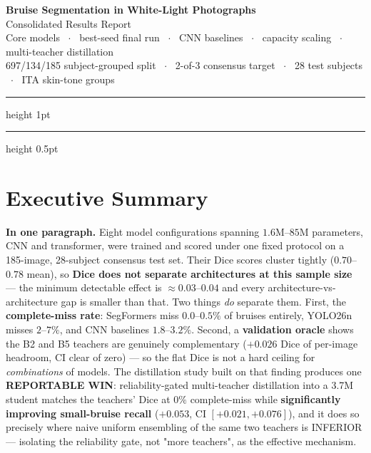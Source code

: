 \documentclass[11pt]{article}
\newcommand{\win}[1]{\textcolor{wingreen}{\textbf{#1}}}
\newcommand{\lose}[1]{\textcolor{losered}{#1}}
\begin{document}
\begin{center}
  {\LARGE\bfseries Bruise Segmentation in White-Light Photographs}\\[5pt]
  {\large Consolidated Results Report}\\[6pt]
  {\small Core models \, $\cdot$ \, best-seed final run \, $\cdot$ \, CNN baselines \, $\cdot$ \,
   capacity scaling \, $\cdot$ \, multi-teacher distillation}\\[3pt]
  {\footnotesize 697/134/185 subject-grouped split \ $\cdot$ \ 2-of-3 consensus target \ $\cdot$ \
   28 test subjects \ $\cdot$ \ ITA skin-tone groups}
\end{center}

\vspace{4pt}
{\color{rulegray}\hrule height 1pt}
\vspace{6pt}

\tableofcontents
\vspace{6pt}
{\color{rulegray}\hrule height 0.5pt}

\section{Executive Summary}

\begin{keybox}
\textbf{In one paragraph.} Eight model configurations spanning $1.6$M--$85$M parameters, CNN and
transformer, were trained and scored under one fixed protocol on a 185-image, 28-subject
consensus test set. Their Dice scores cluster tightly ($0.70$--$0.78$ mean), so \textbf{Dice does
not separate architectures at this sample size} --- the minimum detectable effect is
$\approx0.03$--$0.04$ and every architecture-vs-architecture gap is smaller than that. Two things
\emph{do} separate them. First, the \textbf{complete-miss rate}: SegFormers miss $0.0$--$0.5\%$ of
bruises entirely, YOLO26n misses $2$--$7\%$, and CNN baselines $1.8$--$3.2\%$. Second, a
\textbf{validation oracle} shows the B2 and B5 teachers are genuinely complementary
($+0.026$ Dice of per-image headroom, CI clear of zero) --- so the flat Dice is not a hard ceiling
for \emph{combinations} of models. The distillation study built on that finding produces one
\win{REPORTABLE WIN}: reliability-gated multi-teacher distillation into a 3.7M student matches the
teachers' Dice at $0\%$ complete-miss while \win{significantly improving small-bruise recall}
($+0.053$, CI $[+0.021,+0.076]$), and it does so precisely where naive uniform ensembling of the
same two teachers is \lose{INFERIOR} --- isolating the reliability gate, not "more teachers", as
the effective mechanism.
\end{keybox}
\end{document}
